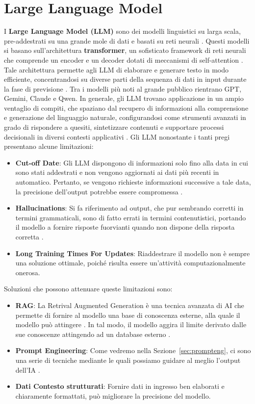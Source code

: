 \section{Large Language Model}

I \textbf{Large Language Model (LLM)} sono dei modelli linguistici su larga scala, pre-addestrati su una grande mole di dati e basati su reti neurali \cite{llm_teoria}.
Questi modelli si basano sull'architettura \textbf{transformer}, un sofisticato framework di reti neurali che comprende un encoder e un decoder dotati di meccanismi di self-attention \cite{llm_teoria, Ghaderi2022Transformers}. Tale architettura permette agli LLM di elaborare e generare testo in modo efficiente, concentrandosi su diverse parti della sequenza di dati in input durante la fase di previsione \cite{llm_teoria, Ghaderi2022Transformers}. 
Tra i modelli più noti al grande pubblico rientrano GPT, Gemini, Claude e Qwen. In generale, gli LLM trovano applicazione in un ampio ventaglio di compiti, che spaziano dal recupero di informazioni alla comprensione e generazione del linguaggio naturale, configurandosi come strumenti avanzati in grado di rispondere a quesiti, sintetizzare contenuti e supportare processi decisionali in diversi contesti applicativi \cite{llm_teoria}.
Gli LLM nonostante i tanti pregi presentano alcune limitazioni: 
\begin{itemize}
    \item \textbf{Cut-off Date}: Gli LLM dispongono di informazioni solo fino alla data in cui sono stati addestrati e non vengono aggiornati ai dati più recenti in automatico. Pertanto, se vengono richieste informazioni successive a tale data, la precisione dell'output potrebbe essere compromessa \cite{llm_teoria}.
    \item \textbf{Hallucinations}: Si fa riferimento ad output, che pur sembrando corretti in termini grammaticali, sono di fatto errati in termini contenutistici, portando il modello a fornire risposte fuorvianti quando non dispone della risposta corretta \cite{llm_teoria}.
    \item \textbf{Long Training Times For Updates}: Riaddestrare il modello non è sempre una soluzione ottimale, poiché risulta essere un'attività computazionalmente onerosa.
\end{itemize}
Soluzioni che possono attenuare queste limitazioni sono:
\begin{itemize}
    \item \textbf{RAG}: La Retrival Augmented Generation è una tecnica avanzata di AI che permette di fornire al modello una base di conoscenza esterne, alla quale il modello può attingere \cite{llm_teoria}. In tal modo, il modello aggira il limite derivato dalle sue conoscenze attingendo ad un database esterno \cite{prompteng}.
    \item \textbf{Prompt Engineering}: Come vedremo nella Sezione~\ref{sec:prompteng}, ci sono una serie di tecniche mediante le quali possiamo guidare al meglio l'output dell'IA \cite{llm_teoria}.
    \item \textbf{Dati Contesto strutturati}: Fornire dati in ingresso ben elaborati e chiaramente formattati, può migliorare la precisione del modello.
\end{itemize}

